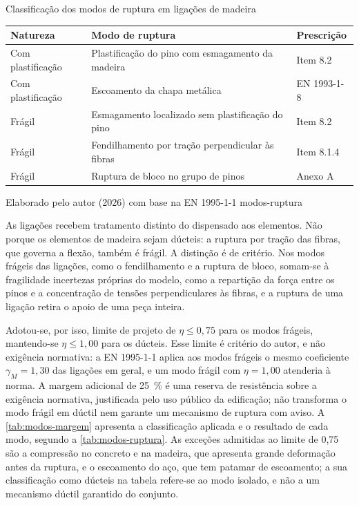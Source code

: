 \tabela
{Classificação dos modos de ruptura em ligações de madeira}
{\footnotesize
\begin{tabular}{lll}
\toprule
    \textbf{Natureza} & \textbf{Modo de ruptura} & \textbf{Prescrição} \\
\midrule
    Com plastificação & Plastificação do pino com esmagamento da madeira & Item 8.2 \\
    Com plastificação & Escoamento da chapa metálica                     & EN 1993-1-8 \\
    Frágil  & Esmagamento localizado sem plastificação do pino  & Item 8.2 \\
    Frágil  & Fendilhamento por tração perpendicular às fibras  & Item 8.1.4 \\
    Frágil  & Ruptura de bloco no grupo de pinos                & Anexo A \\
\bottomrule
\end{tabular}}
{Elaborado pelo autor (2026) com base na EN 1995-1-1 \cite{EN1995-1-1:2004}}
{modos-ruptura}
{}
{}

As ligações recebem tratamento distinto do dispensado aos elementos. Não porque
os elementos de madeira sejam dúcteis: a ruptura por tração das fibras, que
governa a flexão, também é frágil. A distinção é de critério. Nos modos frágeis
das ligações, como o fendilhamento e a ruptura de bloco, somam-se à fragilidade
incertezas próprias do modelo, como a repartição da força entre os pinos e a
concentração de tensões perpendiculares às fibras, e a ruptura de uma ligação
retira o apoio de uma peça inteira.

Adotou-se, por isso, limite de projeto de $\eta \leq 0{,}75$ para os modos
frágeis, mantendo-se $\eta \leq 1{,}00$ para os dúcteis. Esse limite é critério
do autor, e não exigência normativa: a EN 1995-1-1 aplica aos modos frágeis o
mesmo coeficiente $\gamma_M = 1{,}30$ das ligações em geral, e um modo frágil com
$\eta = 1{,}00$ atenderia à norma. A margem adicional de 25~\% é uma reserva de
resistência sobre a exigência normativa, justificada pelo uso público da
edificação; não transforma o modo frágil em dúctil nem garante um mecanismo de
ruptura com aviso. A
\autoref{tab:modos-margem} apresenta a classificação aplicada e o resultado de
cada modo, segundo a \autoref{tab:modos-ruptura}. As exceções admitidas ao
limite de 0,75 são a compressão no concreto e na madeira, que apresenta grande
deformação antes da ruptura, e o escoamento do aço, que tem patamar de
escoamento; a sua classificação como dúcteis na tabela refere-se ao modo
isolado, e não a um mecanismo dúctil garantido do conjunto.

